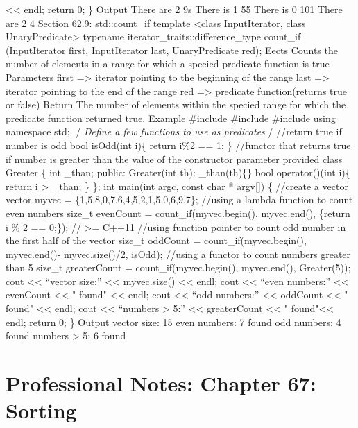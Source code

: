 \textless\textless{} endl; return 0; \} Output There are 2 9s There is 1
55 There is 0 101 There are 2 4 Section 62.9: std::count\_if template
\textless class InputIterator, class UnaryPredicate\textgreater{}
typename iterator\_traits::difference\_type count\_if (InputIterator
first, InputIterator last, UnaryPredicate red); Eects Counts the number
of elements in a range for which a specied predicate function is true
Parameters first =\textgreater{} iterator pointing to the beginning of
the range last =\textgreater{} iterator pointing to the end of the range
red =\textgreater{} predicate function(returns true or false) Return The
number of elements within the specied range for which the predicate
function returned true. Example \#include \#include \#include using
namespace std; /\emph{ Define a few functions to use as predicates }/
//return true if number is odd bool isOdd(int i)\{ return i\%2 == 1; \}
//functor that returns true if number is greater than the value of the
constructor parameter provided class Greater \{ int \_than; public:
Greater(int th): \_than(th)\{\} bool operator()(int i)\{ return i
\textgreater{} \_than; \} \}; int main(int argc, const char *
argv{[}{]}) \{ //create a vector vector myvec =
\{1,5,8,0,7,6,4,5,2,1,5,0,6,9,7\}; //using a lambda function to count
even numbers size\_t evenCount = count\_if(myvec.begin(), myvec.end(),
\href{int\%20i}{}\{return i \% 2 == 0;\}); // \textgreater= C++11
//using function pointer to count odd number in the first half of the
vector size\_t oddCount = count\_if(myvec.begin(), myvec.end()-
myvec.size()/2, isOdd); //using a functor to count numbers greater than
5 size\_t greaterCount = count\_if(myvec.begin(), myvec.end(),
Greater(5)); cout \textless\textless{} ``vector size:''
\textless\textless{} myvec.size() \textless\textless{} endl; cout
\textless\textless{} ``even numbers:'' \textless\textless{} evenCount
\textless\textless{} " found" \textless\textless{} endl; cout
\textless\textless{} ``odd numbers:'' \textless\textless{} oddCount
\textless\textless{} " found" \textless\textless{} endl; cout
\textless\textless{} ``numbers \textgreater{} 5:'' \textless\textless{}
greaterCount \textless\textless{} " found"\textless\textless{} endl;
return 0; \} Output vector size: 15 even numbers: 7 found odd numbers: 4
found numbers \textgreater{} 5: 6 found

\hypertarget{professional-notes-chapter-67-sorting-1}{%
\section{Professional Notes: Chapter 67:
Sorting}\label{professional-notes-chapter-67-sorting-1}}

